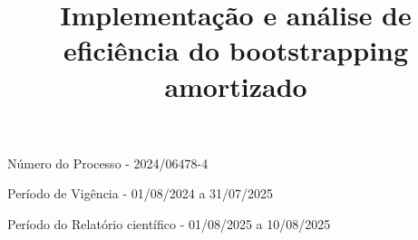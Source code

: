 \documentclass[a4paper,10pt]{article}
\title{\Huge Implementação e análise de eficiência do bootstrapping amortizado}
\author{}
\date{}
\numberwithin{equation}{section} %
\theoremstyle{definition}
\begin{document}
\maketitle


{\Large

Número do Processo - 2024/06478-4


Período de Vigência - 01/08/2024 a 31/07/2025


Período do Relatório científico - 01/08/2025 a 10/08/2025

}

\newpage 



\newpage



\newpage
\printbibliography
\end{document}
